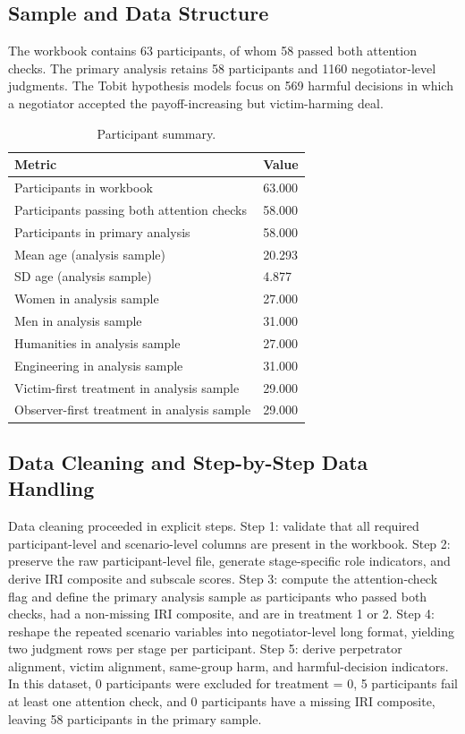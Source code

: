 \documentclass[11pt]{article}
\begin{document}
\subsection{Sample and Data Structure}
The workbook contains 63 participants, of whom 58 passed both attention checks. The primary analysis retains 58 participants and 1160 negotiator-level judgments. The Tobit hypothesis models focus on 569 harmful decisions in which a negotiator accepted the payoff-increasing but victim-harming deal.
\begin{table}[H]
\centering
\caption{Participant summary.}
\label{tab:participant_summary}
\begin{tabular}{ll}
\toprule
Metric & Value \\
\midrule
Participants in workbook & 63.000 \\
Participants passing both attention checks & 58.000 \\
Participants in primary analysis & 58.000 \\
Mean age (analysis sample) & 20.293 \\
SD age (analysis sample) & 4.877 \\
Women in analysis sample & 27.000 \\
Men in analysis sample & 31.000 \\
Humanities in analysis sample & 27.000 \\
Engineering in analysis sample & 31.000 \\
Victim-first treatment in analysis sample & 29.000 \\
Observer-first treatment in analysis sample & 29.000 \\
\bottomrule
\end{tabular}
\end{table}
\subsection{Data Cleaning and Step-by-Step Data Handling}
Data cleaning proceeded in explicit steps. Step 1: validate that all required participant-level and scenario-level columns are present in the workbook. Step 2: preserve the raw participant-level file, generate stage-specific role indicators, and derive IRI composite and subscale scores. Step 3: compute the attention-check flag and define the primary analysis sample as participants who passed both checks, had a non-missing IRI composite, and are in treatment 1 or 2. Step 4: reshape the repeated scenario variables into negotiator-level long format, yielding two judgment rows per stage per participant. Step 5: derive perpetrator alignment, victim alignment, same-group harm, and harmful-decision indicators. In this dataset, 0 participants were excluded for treatment = 0, 5 participants fail at least one attention check, and 0 participants have a missing IRI composite, leaving 58 participants in the primary sample.
\end{document}
